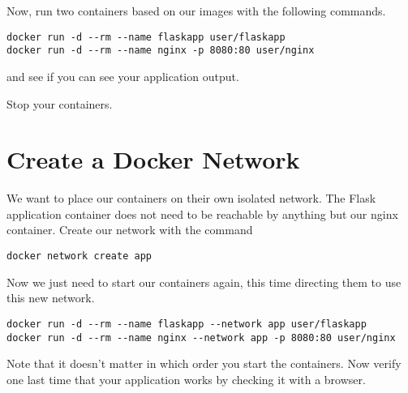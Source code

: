 \documentclass{article}
\begin{document}
Now, run two containers based on our images with the following commands.

\begin{verbatim}
docker run -d --rm --name flaskapp user/flaskapp
docker run -d --rm --name nginx -p 8080:80 user/nginx
\end{verbatim}

and see if you can see your application output. 

Stop your containers.

\section{Create a Docker Network}
We want to place our containers on their own isolated network. The Flask application container does not need to be reachable by anything but our nginx container. Create our network with the command

\texttt{docker network create app}

Now we just need to start our containers again, this time directing them to use this new network.

\begin{verbatim}
docker run -d --rm --name flaskapp --network app user/flaskapp
docker run -d --rm --name nginx --network app -p 8080:80 user/nginx
\end{verbatim}

Note that it doesn't matter in which order you start the containers. Now verify one last time that your application works by checking it with a browser.
\end{document}

